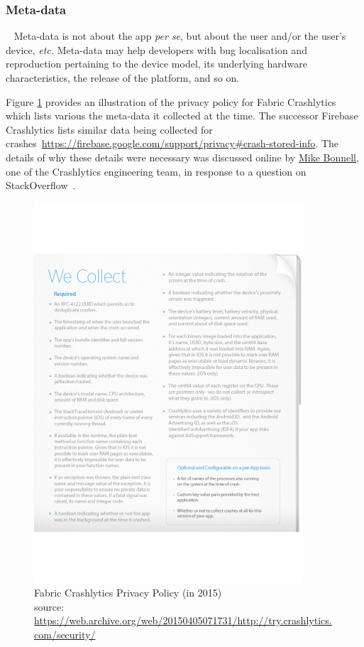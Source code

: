 \subsubsection{Meta-data}~\label{section-meta-data}
Meta-data is not about the app \emph{per se}, but about the user and/or the user's device, \emph{etc.} 
Meta-data may help developers with bug localisation and reproduction pertaining to the device model, its underlying hardware characteristics, the release of the platform, and so on. 

Figure \ref{fig:fabric-crashlytics-privacy-policy} provides an illustration of the privacy policy for Fabric Crashlytics which lists various the meta-data it collected at the time. The successor Firebase Crashlytics lists similar data being collected for crashes~\url{https://firebase.google.com/support/privacy#crash-stored-info}. The details of why these details were necessary was discussed online by \href{https://stackoverflow.com/users/3975963/mike-bonnell}{Mike Bonnell}, 
one of the Crashlytics engineering team, in response to a question on StackOverflow~.

\begin{figure}
    \centering
    \includegraphics[width=10cm]{images/fabric-crashlytics/crashlytics-privacy-policy-38154ffbd69ef44a478b54365dc9b3ad.pdf}
    \caption[Fabric Crashlytics Privacy Policy (in 2015)]{Fabric Crashlytics Privacy Policy (in 2015)\\{source: \tiny \url{https://web.archive.org/web/20150405071731/http://try.crashlytics.com/security/}}}
    \label{fig:fabric-crashlytics-privacy-policy}
\end{figure}

